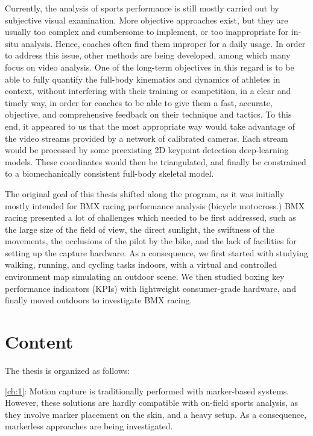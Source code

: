 Currently, the analysis of sports performance is still mostly carried out by subjective visual examination. More objective approaches exist, but they are usually too complex and cumbersome to implement, or too inappropriate for in-situ analysis. Hence, coaches often find them improper for a daily usage. In order to address this issue, other methods are being developed, among which many focus on video analysis. One of the long-term objectives in this regard is to be able to fully quantify the full-body kinematics and dynamics of athletes in context, without interfering with their training or competition, in a clear and timely way, in order for coaches to be able to give them a fast, accurate, objective, and comprehensive feedback on their technique and tactics. To this end, it appeared to us that the most appropriate way would take advantage of the video streams provided by a network of calibrated cameras. Each stream would be processed by some preexisting 2D keypoint detection deep-learning models. These coordinates would then be triangulated, and finally be constrained to a biomechanically consistent full-body skeletal model. 

The original goal of this thesis shifted along the program, as it was initially mostly intended for BMX racing performance analysis (bicycle motocross.) BMX racing presented a lot of challenges which needed to be first addressed, such as the large size of the field of view, the direct sunlight, the swiftness of the movements, the occlusions of the pilot by the bike, and the lack of facilities for setting up the capture hardware. As a consequence, we first started with studying walking, running, and cycling tasks indoors, with a virtual and controlled environment map simulating an outdoor scene. We then studied boxing key performance indicators (KPIs) with lightweight consumer-grade hardware, and finally moved outdoors to investigate BMX racing.


\newpage
\section*{Content}

The thesis is organized as follows:

\noindent\autoref{ch:1}: Motion capture is traditionally performed with marker-based systems. However, these solutions are hardly compatible with on-field sports analysis, as they involve marker placement on the skin, and a heavy setup. As a consequence, markerless approaches are being investigated. 


